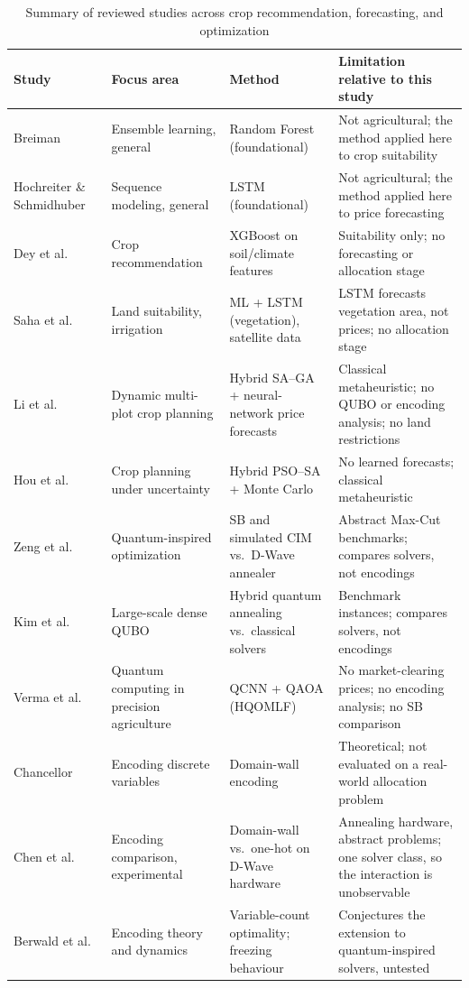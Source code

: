 \documentclass[conference,a4paper]{IEEEtran}
\begin{document}
\begin{table}[t]
\centering
\caption{Summary of reviewed studies across crop recommendation, forecasting, and optimization}
\label{tab:lit}
\footnotesize
\begin{tabular}{p{2.5cm}p{3.0cm}p{3.9cm}p{6.6cm}}
\toprule
Study & Focus area & Method & Limitation relative to this study \\
\midrule
Breiman~\cite{breiman2001} & Ensemble learning, general & Random Forest (foundational) & Not agricultural; the method applied here to crop suitability \\
Hochreiter \& Schmidhuber~\cite{hochreiter1997} & Sequence modeling, general & LSTM (foundational) & Not agricultural; the method applied here to price forecasting \\
Dey et al.~\cite{dey2024} & Crop recommendation & XGBoost on soil/climate features & Suitability only; no forecasting or allocation stage \\
Saha et al.~\cite{saha2025} & Land suitability, irrigation & ML + LSTM (vegetation), satellite data & LSTM forecasts vegetation area, not prices; no allocation stage \\
Li et al.~\cite{li2025} & Dynamic multi-plot crop planning & Hybrid SA--GA + neural-network price forecasts & Classical metaheuristic; no QUBO or encoding analysis; no land restrictions \\
Hou et al.~\cite{hou2026} & Crop planning under uncertainty & Hybrid PSO--SA + Monte Carlo & No learned forecasts; classical metaheuristic \\
Zeng et al.~\cite{zeng2024} & Quantum-inspired optimization & SB and simulated CIM vs.\ D-Wave annealer & Abstract Max-Cut benchmarks; compares solvers, not encodings \\
Kim et al.~\cite{kim2025} & Large-scale dense QUBO & Hybrid quantum annealing vs.\ classical solvers & Benchmark instances; compares solvers, not encodings \\
Verma et al.~\cite{verma2025} & Quantum computing in precision agriculture & QCNN + QAOA (HQOMLF) & No market-clearing prices; no encoding analysis; no SB comparison \\
Chancellor~\cite{chancellor2019} & Encoding discrete variables & Domain-wall encoding & Theoretical; not evaluated on a real-world allocation problem \\
Chen et al.~\cite{chen2021} & Encoding comparison, experimental & Domain-wall vs.\ one-hot on D-Wave hardware & Annealing hardware, abstract problems; one solver class, so the interaction
is unobservable \\
Berwald et al.~\cite{berwald2022} & Encoding theory and dynamics & Variable-count optimality; freezing behaviour & Conjectures the extension to quantum-inspired solvers, untested \\
\bottomrule
\end{tabular}
\end{table}
\end{document}
